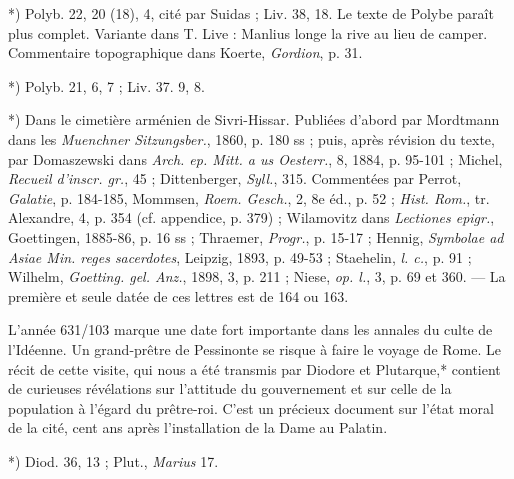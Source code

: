 \documentclass[a4paper, 11pt, oneside, polutonikogreek, french]{article}
\begin{document}
*) Polyb. 22, 20 (18), 4, cité par Suidas ; Liv. 38, 18. Le texte de Polybe paraît plus complet. Variante dans T. Live : Manlius longe la rive au lieu de camper. Commentaire topographique dans Koerte, \emph{Gordion}, p. 31.

*) Polyb. 21, 6, 7 ; Liv. 37. 9, 8.

*) Dans le cimetière arménien de Sivri-Hissar. Publiées d'abord par Mordtmann dans les \emph{Muenchner Sitzungsber.}, 1860, p. 180 ss ; puis, après révision du texte, par Domaszewski dans \emph{Arch. ep. Mitt. a us Oesterr.}, 8, 1884, p. 95-101 ; Michel, \emph{Recueil d'inscr. gr.}, 45 ; Dittenberger, \emph{Syll.}, 315. Commentées par Perrot, \emph{Galatie}, p. 184-185, Mommsen, \emph{Roem. Gesch.}, 2, 8e éd., p. 52 ; \emph{Hist. Rom.}, tr. Alexandre, 4, p. 354 (cf. appendice, p. 379) ; Wilamovitz dans \emph{Lectiones epigr.}, Goettingen, 1885-86, p. 16 ss ; Thraemer, \emph{Progr.}, p. 15-17 ; Hennig, \emph{Symbolae ad Asiae Min. reges sacerdotes}, Leipzig, 1893, p. 49-53 ; Staehelin, \emph{l. c.}, p. 91 ; Wilhelm, \emph{Goetting. gel. Anz.}, 1898, 3, p. 211 ; Niese, \emph{op. l.}, 3, p. 69 et 360. --- La première et seule datée de ces lettres est de 164 ou 163.

L'année 631/103 marque une date fort importante dans les annales du culte de l'Idéenne. Un grand-prêtre de Pessinonte se risque à faire le voyage de Rome. Le récit de cette visite, qui nous a été transmis par Diodore et Plutarque,* contient de curieuses révélations sur l'attitude du gouvernement et sur celle de la population à l'égard du prêtre-roi. C'est un précieux document sur l'état moral de la cité, cent ans après l'installation de la Dame au Palatin.

*) Diod. 36, 13 ; Plut., \emph{Marius} 17.
\end{document}
